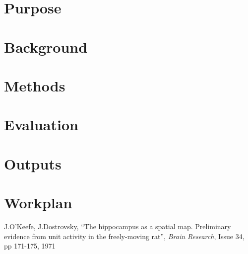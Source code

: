 \documentclass[a4paper,11pt]{article}
\begin{document}
\section{Purpose}

\section{Background}

\section{Methods}

\section{Evaluation}

\section{Outputs}

\section{Workplan}






\begin{thebibliography}{1}
J.O'Keefe, J.Dostrovsky, ``The hippocampus as a spatial map. Preliminary evidence from unit activity in the freely-moving rat'', \textit{Brain Research}, Issue 34, pp 171-175, 1971
\end{thebibliography}
\end{document}
